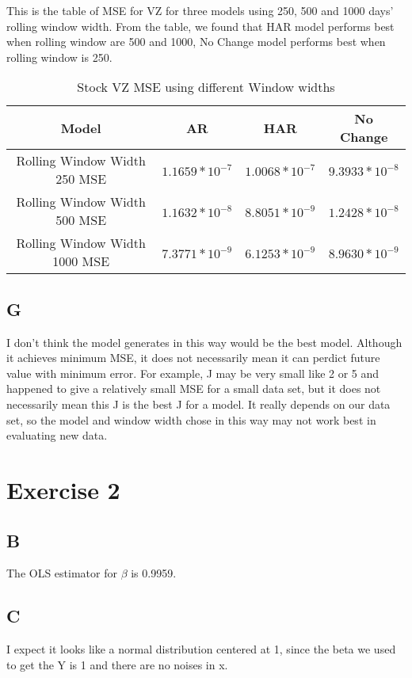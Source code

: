 \documentclass{report}
\begin{document}
This is the table of MSE for VZ for three models using 250, 500 and 1000 days' rolling window width. From the table, we found that HAR model performs best when rolling window are 500 and 1000, No Change model performs best when rolling window is 250.

\begin{table}[H]
\centering
\begin{tabular}{|c|c|c|c|}
\hline
Model&AR&HAR&No Change\\
\hline
Rolling Window Width 250 MSE& $1.1659*10^{-7}$ & $1.0068*10^{-7}$ & $9.3933*10^{-8}$\\
\hline
Rolling Window Width 500 MSE& $1.1632*10^{-8}$ & $8.8051*10^{-9}$ & $1.2428*10^{-8}$\\
\hline
Rolling Window Width 1000 MSE& $7.3771*10^{-9}$ & $6.1253*10^{-9}$ & $8.9630*10^{-9}$\\
\hline
\end{tabular}
\caption{ Stock VZ MSE using different Window widths}
\end{table}
\subsection{G}

I don't think the model generates in this way would be the best model. Although it achieves minimum MSE, it does not necessarily mean it can perdict future value with minimum error. For example, J may be very small like 2 or 5 and happened to give a relatively small MSE for a small data set, but it does not necessarily mean this J is the best J for a model. It really depends on our data set, so the model and window width chose in this way may not work best in evaluating new data.
\section{ Exercise 2}

\subsection{B}

The OLS estimator for $\beta$ is 0.9959.

\subsection{C}

I expect it looks like a normal distribution centered at 1, since the beta we used to get the Y is 1 and there are no noises in x.
\end{document}
